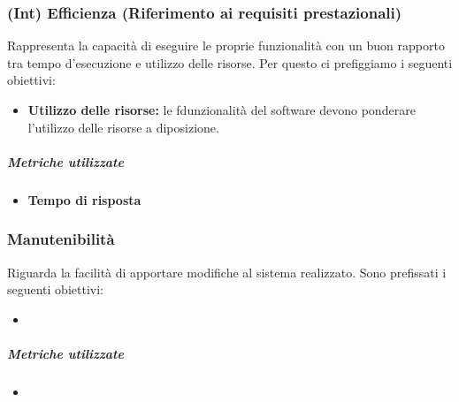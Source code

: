 \subsubsection{(Int) Efficienza (Riferimento ai requisiti prestazionali)}
Rappresenta la capacità di eseguire le proprie funzionalità con un buon rapporto tra tempo d'esecuzione e utilizzo delle risorse. Per questo ci prefiggiamo i seguenti obiettivi:
\begin{itemize}
	\item \textbf{Utilizzo delle risorse:} le fdunzionalità del software devono ponderare l'utilizzo delle risorse a diposizione.
\end{itemize}
\vspace{0.8cm}
\subparagraph{Metriche utilizzate}
\begin{itemize}
	\item \textbf{Tempo di risposta}
\end{itemize}
\begin{table}[!htpb]
\end{table}
\subsubsection{Manutenibilità}
Riguarda la facilità di apportare modifiche al sistema realizzato. Sono prefissati i seguenti obiettivi:
\begin{itemize}
	\item \textbf{}
\end{itemize}
\vspace{0.8cm}
\subparagraph{Metriche utilizzate}
\begin{itemize}
	\item
\end{itemize}
